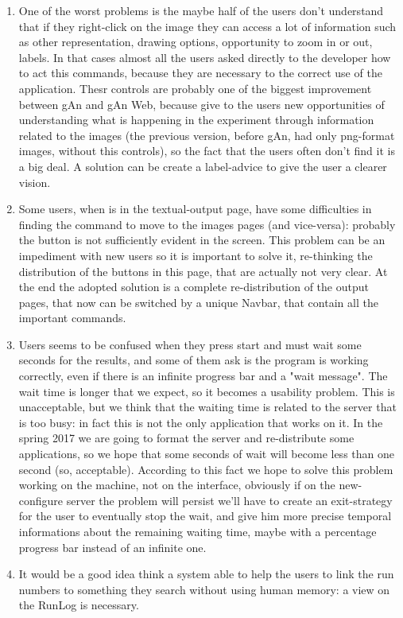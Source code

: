 \begin{enumerate}
\item 
One of the worst problems is the maybe half of the users don't understand that if they right-click on the image they can access a lot of information such as other representation, drawing options, opportunity to zoom in or out, labels. In that cases almost all the users asked directly to the developer how to act this commands, because they are necessary to the correct use of the application. Thesr controls are probably one of the biggest improvement between gAn and gAn Web, because give to the users new opportunities of understanding what is happening in the experiment through information related to the images (the previous version, before gAn, had only png-format images, without this controls), so the fact that the users often don't find it is a big deal. A solution can be create a label-advice to give the user a clearer vision.

\item
Some users, when is in the textual-output page, have some difficulties in finding the command to move to the images pages (and vice-versa): probably the button is not sufficiently evident in the screen. This problem can be an impediment with new users so it is important to solve it, re-thinking the distribution of the buttons in this page, that are actually not very clear. At the end the adopted solution is a complete re-distribution of the output pages, that now can be switched by a unique Navbar, that contain all the important commands.

\item
Users seems to be confused when they press start and must wait some seconds for the results, and some of them ask is the program is working correctly, even if there is an infinite progress bar and a "wait message". The wait time is longer that we expect, so it becomes a usability problem. This is unacceptable, but we think that the waiting time is related to the server that is too busy: in fact this is not the only application that works on it. In the spring 2017 we are going to format the server and re-distribute some applications, so we hope that some seconds of wait will become less than one second (so, acceptable). According to this fact we hope to solve this problem working on the machine, not on the interface, obviously if on the new-configure server the problem will persist we'll have to create an exit-strategy for the user to eventually stop the wait, and give him more precise temporal informations about the remaining waiting time, maybe with a percentage progress bar instead of an infinite one.

\item 
It would be a good idea think a system able to help the users to link the run numbers to something they search without using human memory: a view on the RunLog is necessary.

\end{enumerate}

